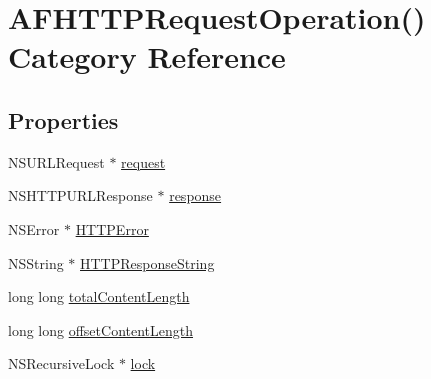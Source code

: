 \hypertarget{category_a_f_h_t_t_p_request_operation_07_08}{\section{A\-F\-H\-T\-T\-P\-Request\-Operation() Category Reference}
\label{category_a_f_h_t_t_p_request_operation_07_08}
}
\subsection*{Properties}
\begin{DoxyCompactItemize}
\item 
N\-S\-U\-R\-L\-Request $\ast$ \hyperlink{category_a_f_h_t_t_p_request_operation_07_08_a811d831afaf93bd84be93c2b87d82cbf}{request}
\item 
N\-S\-H\-T\-T\-P\-U\-R\-L\-Response $\ast$ \hyperlink{category_a_f_h_t_t_p_request_operation_07_08_a5ad5b807b287afadadefdbec24456ee5}{response}
\item 
N\-S\-Error $\ast$ \hyperlink{category_a_f_h_t_t_p_request_operation_07_08_ae833b3847de8022d4ccb50e1eaaf12d3}{H\-T\-T\-P\-Error}
\item 
N\-S\-String $\ast$ \hyperlink{category_a_f_h_t_t_p_request_operation_07_08_a4bac3f36c855d720a4fddbf2b02da0ee}{H\-T\-T\-P\-Response\-String}
\item 
long long \hyperlink{category_a_f_h_t_t_p_request_operation_07_08_aa0bc9866e57a94c190619d19d26b1ada}{total\-Content\-Length}
\item 
long long \hyperlink{category_a_f_h_t_t_p_request_operation_07_08_ac6ba2b4c419dc512931aae1eb8957e3d}{offset\-Content\-Length}
\item 
N\-S\-Recursive\-Lock $\ast$ \hyperlink{category_a_f_h_t_t_p_request_operation_07_08_af15e0185abdd50087387f36f1f076a51}{lock}
\end{DoxyCompactItemize}


